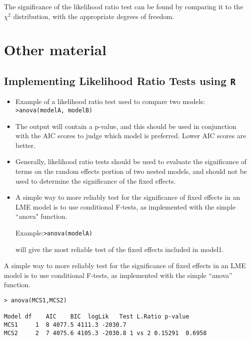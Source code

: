 \documentclass[MAIN.tex]{subfiles}
\begin{document}
The significance of the likelihood ratio test can be found by comparing it to the  $\chi^2$ distribution, with the appropriate degrees of freedom.



\section{Other material}
\subsection{Implementing Likelihood Ratio Tests using \texttt{R}}
\begin{itemize}
	\item Example of a likelihood ratio test used to compare two models: \newline \texttt{>anova(modelA, modelB)}
	
	\item The output will contain a p-value, and this should be used in conjunction with the AIC scores to judge which model is preferred. Lower AIC scores are better.
	
	\item Generally, likelihood ratio tests should be used to evaluate the significance of terms on the
	random effects portion of two nested models, and should not be used to determine the significance of the fixed effects.
	\item A simple way to more reliably test for the significance of fixed effects in an LME model is to use
	conditional F-tests, as implemented with the simple ``anova" function.
	
	
Example:\newline \texttt{>anova(modelA)}
	
	
	will give the most reliable test of the fixed effects included in model1.
\end{itemize}

\bigskip

A simple way to more reliably test for the significance of fixed effects in an LME model is to use 
conditional F-tests, as implemented with the simple “anova” function. 


\begin{framed}
\begin{verbatim}
> anova(MCS1,MCS2)

Model df    AIC    BIC  logLik   Test L.Ratio p-value
MCS1     1  8 4077.5 4111.3 -2030.7
MCS2     2  7 4075.6 4105.3 -2030.8 1 vs 2 0.15291  0.6958
\end{verbatim}
\end{framed}
	
\end{document}
